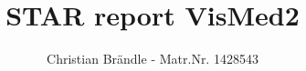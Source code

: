 \documentclass[]{article}
\title{STAR report VisMed2}
\author{Christian Brändle - Matr.Nr. 1428543}
\begin{document}
\maketitle

%






\nocite{*}

\end{document}
